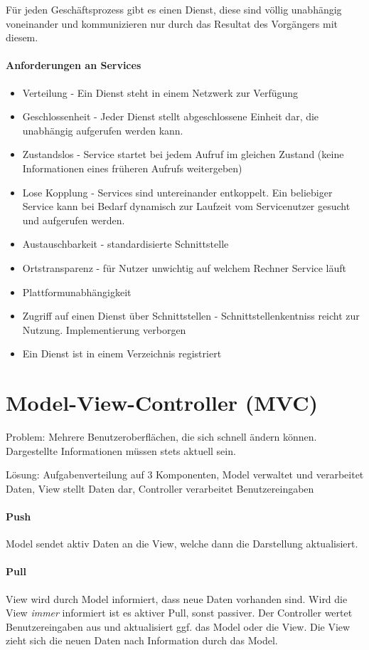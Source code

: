 Für jeden Geschäftsprozess gibt es einen Dienst, diese sind völlig unabhängig
voneinander und kommunizieren nur durch das Resultat des Vorgängers mit diesem.

\paragraph{Anforderungen an Services}
\begin{itemize}
\itemsep1pt\parskip0pt
\item
  Verteilung - Ein Dienst steht in einem Netzwerk zur Verfügung
\item
  Geschlossenheit - Jeder Dienst stellt abgeschlossene Einheit dar, die unabhängig aufgerufen werden kann.
\item
  Zustandslos - Service startet bei jedem Aufruf im gleichen Zustand (keine Informationen eines früheren Aufrufs weitergeben)
\item
  Lose Kopplung - Services sind untereinander entkoppelt. Ein beliebiger Service kann bei Bedarf dynamisch zur Laufzeit vom Servicenutzer gesucht und aufgerufen werden.
\item
  Austauschbarkeit - standardisierte Schnittstelle
\item
  Ortstransparenz - für Nutzer unwichtig auf welchem Rechner Service läuft
\item
  Plattformunabhängigkeit
\item
  Zugriff auf einen Dienst über Schnittstellen - Schnittstellenkentniss reicht zur Nutzung. Implementierung verborgen
\item
  Ein Dienst ist in einem Verzeichnis registriert  
\end{itemize}

\section{Model-View-Controller
(MVC)}\label{model-view-controller-mvc}

Problem: Mehrere Benutzeroberflächen, die sich schnell ändern können.
Dargestellte Informationen müssen stets aktuell sein.

Lösung: Aufgabenverteilung auf 3 Komponenten, Model verwaltet und verarbeitet
Daten, View stellt Daten dar, Controller verarbeitet Benutzereingaben

\paragraph{Push}\label{push-1}

Model sendet aktiv Daten an die View, welche dann die Darstellung
aktualisiert.

\paragraph{Pull}\label{pull-1}

View wird durch Model informiert, dass neue Daten vorhanden sind. Wird
die View \emph{immer} informiert ist es aktiver Pull, sonst passiver.
Der Controller wertet Benutzereingaben aus und aktualisiert ggf. das
Model oder die View. Die View zieht sich die neuen Daten nach
Information durch das Model.
